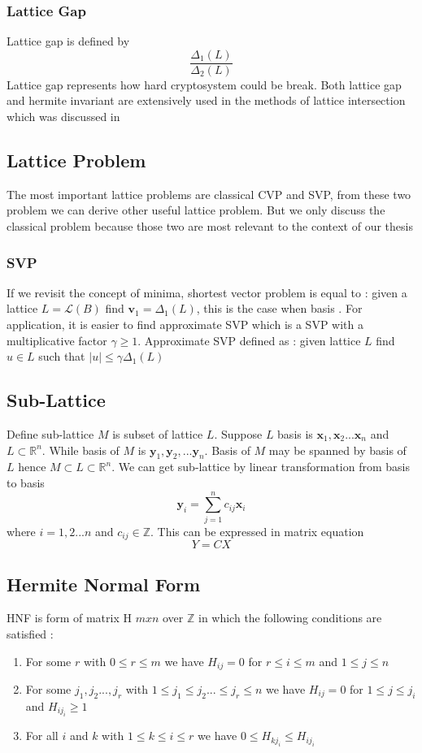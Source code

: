 \subsubsection{Lattice Gap}
Lattice gap is defined by 
\[ \frac{\Delta_{1}(L)}{\Delta_{2}(L)} \]
Lattice gap represents how hard cryptosystem could be break. Both lattice gap and hermite invariant are extensively used in the methods of lattice intersection which was discussed in \cite{Wil12}

\subsection{Lattice Problem}
The most important lattice problems are classical CVP and SVP, from these two problem we can derive other useful lattice problem. But we only discuss the classical problem because those two are most relevant to the context of our thesis
\subsubsection{SVP}
If we revisit the concept of minima, shortest vector problem is equal to : given a lattice $L=\mathcal{L}(B)$ find $\mathbf{v}_1 = \Delta_{1}(L)$, this is the case when basis . For application, it is easier to find approximate SVP which is a SVP with a multiplicative factor $\gamma \geq 1$. Approximate SVP defined as : given lattice $L$ find $u \in L$ such that $ |u| \leq \gamma \Delta_{1}(L) $

\subsection{Sub-Lattice}
Define sub-lattice $M$ is subset of lattice $L$. Suppose $L$ basis is $ \mathbf{x}_{1}, \mathbf{x}_{2} ... \mathbf{x}_{n}$ and $L \subset \mathbb{R}^{n}$. While basis of $M$ is $\mathbf{y}_{1}, \mathbf{y}_{2}, ... \mathbf{y}_{n}$. Basis of $M$ may be spanned by basis of $L$ hence $M \subset L \subset \mathbb{R}^{n}$. We can get sub-lattice by linear transformation from basis to basis
\[ \mathbf{y}_{i} = \sum_{j=1}^{n} c_{ij}\mathbf{x}_{i} \] where $i=1,2...n$ and $c_{ij} \in \mathbb{Z}$. This can be expressed in matrix equation
\[ Y = CX \]
\subsection{Hermite Normal Form}
HNF is form of matrix H $ m x n $ over $\mathbb{Z}$ in which the following conditions are satisfied :
\begin{enumerate}
\item For some $r$ with $ 0 \leq r \leq m $ we have $H_{ij}=0$ for $r \le i \leq m $ and $1 \leq j \leq n $
\item For some $j_{1}, j_{2}..., j_{r}$ with $ 1 \leq j_{1} \le j_{2} ... \le j_{r} \leq n $ we have $H_{ij}=0$ for $ 1 \leq j \le j_{i}$ and $H_{ij_i} \geq 1$
\item For all $i$ and $k$ with $1 \leq k \le i \leq r$ we have $0 \leq H_{kj_i} \le H_{ij_i} $
\end{enumerate}
